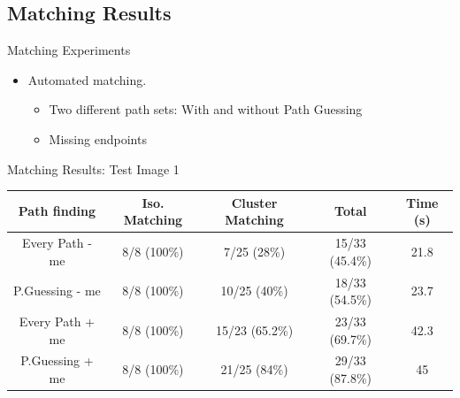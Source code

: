 \documentclass[xcolor=table]{beamer}
\begin{document}
\subsection{Matching Results}
\begin{frame}{Matching Experiments}

  \begin{itemize}
  \item Automated matching. 
    \begin{itemize}
    \item Two different path sets: With and without Path Guessing 
    \item Missing endpoints 
    \end{itemize}
  \end{itemize}

\end{frame}

\begin{frame}{Matching Results: Test Image 1}

\begin{scriptsize}
\begin{table}[h]
\begin{center}
\begin{tabular}[h]{|c|c|c|c|c|}
    \hline
    \rowcolor{gray!35}
    Path finding & Iso. Matching & Cluster Matching 
    & Total
    & Time (s) \\ 
    \hline  
    Every Path - me & 8/8 (100\%) & 7/25 (28\%) & 15/33 (45.4\%) & 21.8 \\ 
    \hline
    P.Guessing - me & 8/8 (100\%) & 10/25 (40\%) & 18/33 (54.5\%) & 23.7\\
    \hline
    Every Path + me & 8/8 (100\%)& 15/23 (65.2\%) & 23/33 (69.7\%)& 42.3 \\
    \hline
    P.Guessing + me & 8/8 (100\%)& 21/25 (84\%) & 29/33 \alert{(87.8\%)} & 45 \\
    \hline
  \end{tabular}
\end{center}
\end{table}
\end{scriptsize}

\end{frame}
\end{document}
